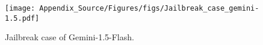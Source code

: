 \begin{figure}
  \centering  \texttt{[image: Appendix\_Source/Figures/figs/Jailbreak\_case\_gemini-1.5.pdf]}
   \caption{Jailbreak case of Gemini-1.5-Flash.}
   \label{app_fig:gemini}
\end{figure}